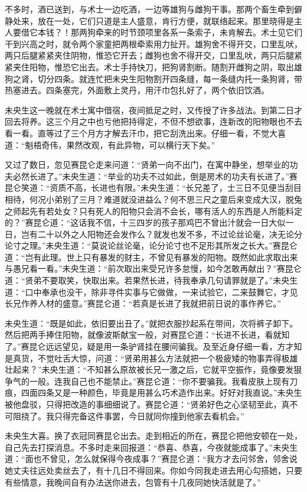 \documentclass[a4paper,12pt,UTF8,twoside]{ctexbook}
\begin{document}
不多时，酒已送到，与术士一边吃酒，一边等雄狗与雌狗干事。那两个畜生牵到僻静处来，放在一处，它们只道是主人盛意，肯行方便，就联络起来。那里晓得是主人要借它本钱？！那两狗牵来的时节颈项里各系一条索子，未肯解去。术士见它们干到兴高之时，就令两个家童把两根牵索用力扯开。雄狗舍不得开交，口里乱吠，两只后腿紧紧夹住阴物，惟恐它开去；雌狗也舍不得开交，口里乱吠，两只后腿紧紧夹住阳物，惟恐它出去。术士手持快刀，把狗肾割断。随割开雌狗之阴，取出雄狗之肾，切分四条。就连忙把未央生阳物割开四条缝，每一条缝内托一条狗肾，带热塞进去。四条塞完，外面敷上灵丹，用汗巾包扎好了，两个依旧饮酒。

未央生这一晚就在术士寓中借宿，夜间抵足之时，又传授了许多战法。到第二日才回去将养。这三个月之中也亏他把持得定，不但不想欲事，连新改的阳物眼也不去看一看。直等过了三个月方才解去汗巾，把它刮洗出来。仔细一看，不觉大喜道：“魁梧奇伟，果然改观，有此异物，可以横行天下矣。”

又过了数日，忽见赛昆仑走来问道：“贤弟一向不出门，在寓中静坐，想举业的功夫必然长进了。”未央生道：“举业的功夫不过如此，倒是房术的功夫有长进了。”赛昆仑笑道：“资质不高，长进也有限。”未央生道：“长兄差了，士三日不见便当刮目相待，何况小弟别了三月？难道就没进益么？何不思三尺之童后来变成大汉，脱兔之师起先有若处女？只有死人的阳物只会消不会长，哪有活人的东西是人所能料定的？”赛昆仑道：“这话我不信，十三四岁的孩子那鸡巴不曾出汁就会一日大似一日，岂有二十以外之人阳物还会发作么？就发也发不多，不过论丝论毫，决无论分论寸之理。”未央生道：“莫说论丝论毫，论分论寸也不足形其所发之长大。”赛昆仑道：“岂有此理。世上只有暴发的财主，不曾见有暴发的阳物。既然如此求取出来与愚兄看一看。”未央生道：“前次取出来受兄许多怠慢，如今怎敢再献出？”赛昆仑道：“贤弟不要取笑，快取出来。若果然长进，待我奉承几句请罪就是了。”未央生道：“口中奉承也没干，除非寻件实事与它做做，一来试验它，二来鼓舞它，才见长兄作养人材的盛意。”赛昆仑道：“若真是长进了我就把前日说的事作养它。”

未央生道：“既是如此，依旧要出丑了。”就把衣服抄起系在带间，次将裤子卸下。然后把两手捧住阳物，就像波斯献宝一般，对赛昆仑道：“长进不长进，看就知了。”赛昆仑远远望见，疑是用一条驴肾挂在腰间骗我。及至近身仔细一看，方才知是真货，不觉吐舌大惊，问道：“贤弟用甚么方法就把一个极疲矮的物事弄得极雄壮起来？”未央生道：“不知甚么原故被长兄一激之后，它就平空振作，竟像要发狠争气的一般。连我自己也不能禁止。”赛昆仑道：“你不要骗我。我看皮肤上现有刀痕，四面四条又是一种颜色，毕竟是用甚么巧术造作出来。好好对我直说。”未央生被他盘驳，只得把改造的事细细说了。赛昆仑道：“贤弟好色之心坚韧至此，真不可阻挠了。我只得完备这件事罢，今日就同你撞到他家去看机会。”

未央生大喜。换了衣冠同赛昆仑出去。走到相近的所在，赛昆仑把他安顿在一处，自己先去打探消息。不多时走来回报道：“恭喜、恭喜，今夜就能成事了。”未央生道：“面也不曾见，怎么就保得今夜成事？”赛昆仑道：“我方才去问邻舍，邻舍说她丈夫往远处卖丝去了，有十几日不得回来。你如今同我走进去用心勾搭她，只要有些情意，我晚间自有办法送你进去，包管有十几夜同她快活就是了。”
\end{document}
